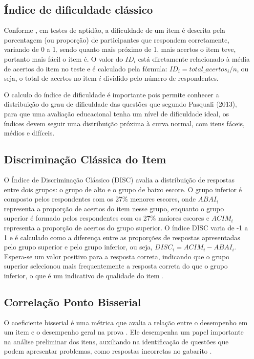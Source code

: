 \subsection{Índice de dificuldade clássico}

Conforme , em testes de aptidão, a dificuldade de um item é descrita pela porcentagem (ou proporção) de participantes que respondem corretamente, variando de 0 a 1, sendo quanto mais próximo de 1, mais acertos o item teve, portanto mais fácil o item é. O valor do $ID_i$ está diretamente relacionado à média de acertos do item no teste e é calculado  pela fórmula: $ID_i = total\_acertos_i /n$, ou seja, o total de acertos no item $i$ dividido pelo número de respondentes. 

O calculo do índice de dificuldade é importante pois permite conhecer a distribuição do grau de dificuldade das questões que segundo Pasquali (2013), para que uma avaliação educacional tenha um nível de dificuldade ideal, os índices devem seguir uma distribuição próxima à curva normal, com itens fáceis, médios e difíceis.

\subsection{Discriminação Clássica do Item}

O Índice de Discriminação Clássico (DISC) avalia a distribuição de respostas entre dois grupos: o grupo de alto e o grupo de baixo escore. O grupo inferior é composto pelos respondentes com os 27\% menores escores, onde $ABAI_i$ representa a proporção de acertos do item nesse grupo, enquanto o grupo superior é formado pelos respondentes com os 27\% maiores escores e $ACIM_i$ representa a proporção de acertos do grupo superior. O índice DISC varia de -1 a 1 e é calculado como a diferença entre as proporções de respostas apresentadas pelo grupo superior e pelo grupo inferior, ou seja, $DISC_i = ACIM_i - ABAI_i$. Espera-se um valor positivo para a resposta correta, indicando que o grupo superior selecionou mais frequentemente a resposta correta do que o grupo inferior, o que é um indicativo de qualidade do item  \cite{de1983consideraccoes}. 



\subsection{Correlação Ponto Bisserial}

O coeficiente bisserial é uma métrica que avalia a relação entre o desempenho em um item e o desempenho geral na prova \cite{BORGATTO2012}. Ele desempenha um papel importante na análise preliminar dos itens, auxiliando na identificação de questões que podem apresentar problemas, como respostas incorretas no gabarito \cite{de2000teoria}.

